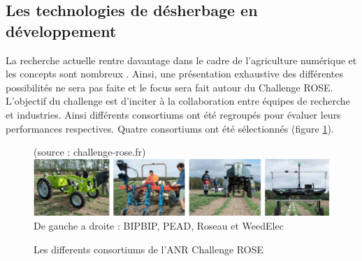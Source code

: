 \documentclass[../thesis.tex]{subfiles}
\begin{document}
    \subsection{Les technologies de désherbage en développement}
    
    La recherche actuelle rentre davantage dans le cadre de l'agriculture numérique et les concepts sont nombreux \cite{KORRES2019243, VANMOURIK2021105031, telecom2010005}. Ainsi, une présentation exhaustive des différentes possibilités ne sera pas faite et le focus sera fait autour du Challenge ROSE. L'objectif du challenge est d'inciter à la collaboration entre équipes de recherche et industries. Ainsi différents consortiums ont été regroupés pour évaluer leurs performances respectives. Quatre consortiums ont été sélectionnés (figure \ref{fig:02-anr-challenge}).
    
    
    
    \begin{figure}[H]
        \centering
        {\scriptsize (source : challenge-rose.fr)} \\
        \includegraphics[width=1\linewidth]{img/intro/anr-difference}
        {\scriptsize De gauche a droite : BIPBIP, PEAD, Roseau et WeedElec}
        \caption{Les differents consortiums de l'ANR Challenge ROSE}
        \label{fig:02-anr-challenge}
    \end{figure}
    
\end{document}
